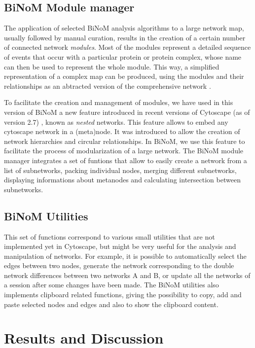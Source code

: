 \documentclass[10pt]{bmc_article}
\newenvironment{bmcformat}{\baselineskip20pt\sloppy\setboolean{publ}{false}}{\baselineskip20pt\sloppy}
\begin{document}
\begin{bmcformat}
\subsection*{BiNoM Module manager}
The application of selected BiNoM analysis algorithms to a large network map,
usually followed by manual curation, results in the creation of a certain number
of connected network \emph{modules}. Most of the modules represent a detailed
sequence of events that occur with a particular protein or protein complex,
whose name can then be used to represent the whole module. This way, a
simplified representation of a complex map can be produced, using the modules
and their relationships as an abtracted version of the comprehensive network
\cite{calzone2008comprehensive}.

To facilitate the creation and management of modules, we have used in this
version of BiNoM a new feature introduced in recent versions of Cytoscape (as of
version 2.7) \cite{cline2007integration}, known as \emph{nested} networks. This
feature allows to embed any cytoscape network in a (meta)node. It was
introduced to allow the creation of network hierarchies and circular
relationships. In BiNoM, we use this feature to facilitate the process of
modularization of a large network. The BiNoM module manager integrates a set of
funtions that allow to easily create a network from a list of subnetworks,
packing individual nodes, merging different subnetworks, displaying informations
about metanodes and calculating intersection between subnetworks.

\subsection*{BiNoM Utilities}
This set of functions correspond to various small utilities that are not
implemented yet in Cytoscape, but might be very useful for the analysis and
manipulation of networks. For example, it is possible to automatically select
the edges between two nodes, generate the network corresponding to the double
network differences between two networks A and B, or update all the networks of
a session after some changes have been made. The BiNoM utilities also implements
clipboard related functions, giving the possibility to copy, add and paste
selected nodes and edges and also to show the clipboard content. 


\section*{Results and Discussion}


\end{bmcformat}
\end{document}
